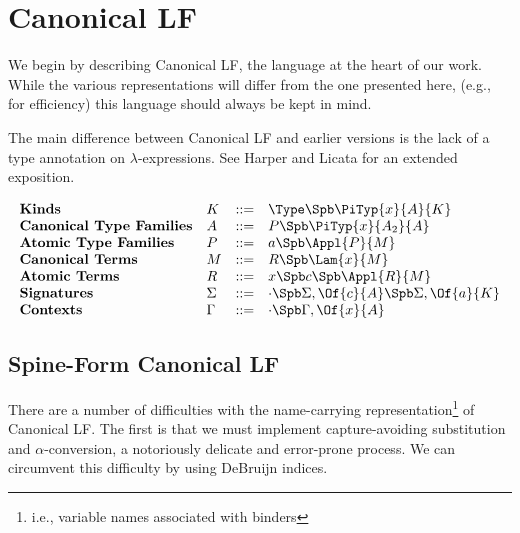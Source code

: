 

\section{Canonical LF}
We begin by describing Canonical LF, the language at the heart of our
work.  While the various representations will differ from the one presented here, 
(e.g., for efficiency) this language should always be kept in mind.

The main difference between Canonical LF and earlier versions
is the lack of a type annotation on $\lambda$-expressions.
See Harper and Licata\cite{HarperLicataCLF} for an extended
exposition.

$$
\begin{array}{llll}
\textbf{Kinds} & K & ::= & \Type \Spb \PiTyp{x}{A}{K} \\
\textbf{Canonical Type Families} & A & ::= & P \Spb \PiTyp{x}{A_2}{A} \\
\textbf{Atomic Type Families} & P & ::= & a \Spb \Appl{P}{M} \\
\textbf{Canonical Terms} & M & ::= & R \Spb \Lam{x}{M} \\
\textbf{Atomic Terms} & R & ::= &  x \Spb c \Spb \Appl{R}{M}\\
\textbf{Signatures} & \Sigma & ::= & \cdot \Spb \Sigma,\Of{c}{A} 
\Spb \Sigma,\Of{a}{K}\\
\textbf{Contexts} & \Gamma & ::= & \cdot \Spb \Gamma,\Of{x}{A}\\
\end{array}
$$


\subsection{Spine-Form Canonical LF}

There are a number of difficulties with the name-carrying 
representation\footnote{i.e., variable names associated with binders}
of Canonical LF.  The first is that we must
implement capture-avoiding substitution and $\alpha$-conversion,
a notoriously delicate and error-prone process.
We can circumvent this difficulty
by using DeBruijn indices\cite{DeBruijn80}. 

